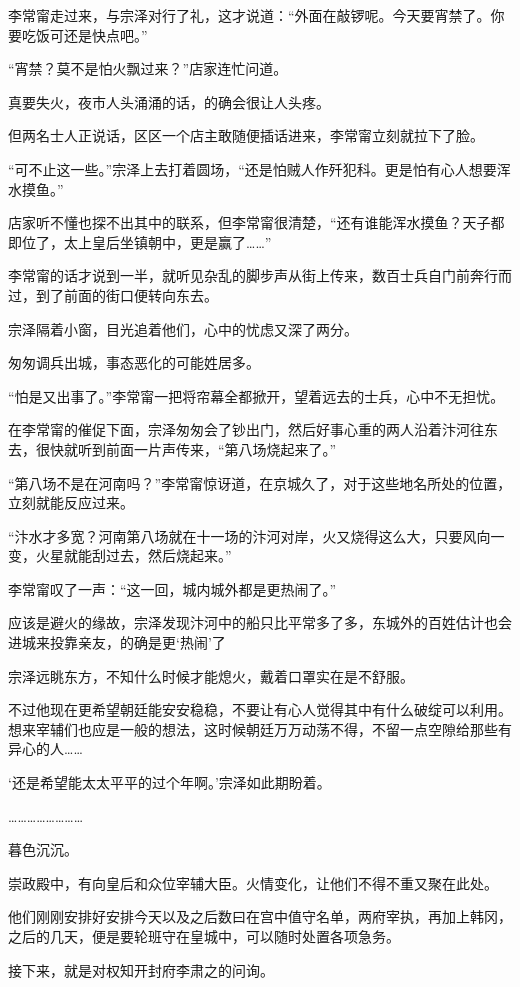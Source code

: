 李常甯走过来，与宗泽对行了礼，这才说道：“外面在敲锣呢。今天要宵禁了。你要吃饭可还是快点吧。”

“宵禁？莫不是怕火飘过来？”店家连忙问道。

真要失火，夜市人头涌涌的话，的确会很让人头疼。

但两名士人正说话，区区一个店主敢随便插话进来，李常甯立刻就拉下了脸。

“可不止这一些。”宗泽上去打着圆场，“还是怕贼人作歼犯科。更是怕有心人想要浑水摸鱼。”

店家听不懂也探不出其中的联系，但李常甯很清楚，“还有谁能浑水摸鱼？天子都即位了，太上皇后坐镇朝中，更是赢了……”

李常甯的话才说到一半，就听见杂乱的脚步声从街上传来，数百士兵自门前奔行而过，到了前面的街口便转向东去。

宗泽隔着小窗，目光追着他们，心中的忧虑又深了两分。

匆匆调兵出城，事态恶化的可能姓居多。

“怕是又出事了。”李常甯一把将帘幕全都掀开，望着远去的士兵，心中不无担忧。

在李常甯的催促下面，宗泽匆匆会了钞出门，然后好事心重的两人沿着汴河往东去，很快就听到前面一片声传来，“第八场烧起来了。”

“第八场不是在河南吗？”李常甯惊讶道，在京城久了，对于这些地名所处的位置，立刻就能反应过来。

“汴水才多宽？河南第八场就在十一场的汴河对岸，火又烧得这么大，只要风向一变，火星就能刮过去，然后烧起来。”

李常甯叹了一声：“这一回，城内城外都是更热闹了。”

应该是避火的缘故，宗泽发现汴河中的船只比平常多了多，东城外的百姓估计也会进城来投靠亲友，的确是更‘热闹’了

宗泽远眺东方，不知什么时候才能熄火，戴着口罩实在是不舒服。

不过他现在更希望朝廷能安安稳稳，不要让有心人觉得其中有什么破绽可以利用。想来宰辅们也应是一般的想法，这时候朝廷万万动荡不得，不留一点空隙给那些有异心的人……

‘还是希望能太太平平的过个年啊。’宗泽如此期盼着。

……………………

暮色沉沉。

崇政殿中，有向皇后和众位宰辅大臣。火情变化，让他们不得不重又聚在此处。

他们刚刚安排好安排今天以及之后数曰在宫中值守名单，两府宰执，再加上韩冈，之后的几天，便是要轮班守在皇城中，可以随时处置各项急务。

接下来，就是对权知开封府李肃之的问询。

